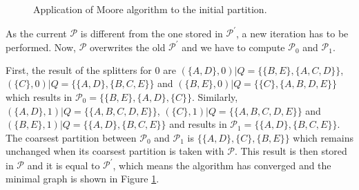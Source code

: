 {%

\begin{figure}
\centering
{}
\caption{Application of Moore algorithm to the initial partition.\label{fig:moore_fin}}
\end{figure}

As the current $\mathcal{P}$ is different from the one stored in $\mathcal{P}^{\prime}$, a new iteration has to be performed. Now, $\mathcal{P}$ overwrites the old $\mathcal{P}^{\prime}$ and we have to compute $\mathcal{P}_0$ and $\mathcal{P}_1$.

First, the result of the splitters for 0 are $(\{A,D\},0)|Q = \{\{B,E\},\{A,C,D\}\}$, $(\{C\},0)|Q = \{\{A,D\},\{B,C,E\}\}$ and $(\{B,E\},0)|Q = \{\{C\},\{A,B,D,E\}\}$ which results in \linebreak $\mathcal{P}_0 = \{\{B,E\}, \{A,D\}, \{C\}\}$. Similarly, $(\{A,D\},1)|Q = \{\{A,B,C,D,E\}\}$, $(\{C\},1)|Q = \{\{A,B,C,D,E\}\}$ and $(\{B,E\},1)|Q = \{\{A,D\},\{B,C,E\}\}$ and results in \linebreak $\mathcal{P}_1 = \{\{A,D\},\{B,C,E\}\}$. The coarsest partition between $\mathcal{P}_0$ and $\mathcal{P}_1$ is $\{\{A,D\},\{C\},\{B,E\}\}$ which remains unchanged when its coarsest partition is taken with $\mathcal{P}$. This result is then stored in $\mathcal{P}$ and it is equal to $\mathcal{P}^{\prime}$, which means the algorithm has converged and the minimal graph is shown in Figure \ref{fig:moore_fin}.

}
